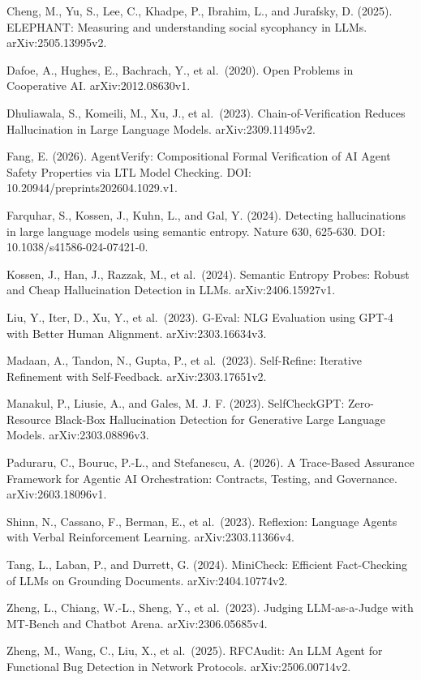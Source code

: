 \documentclass[
  10pt,
  a4paper,
]{article}
\begin{document}
Cheng, M., Yu, S., Lee, C., Khadpe, P., Ibrahim, L., and Jurafsky, D.
(2025). ELEPHANT: Measuring and understanding social sycophancy in LLMs.
arXiv:2505.13995v2.

Dafoe, A., Hughes, E., Bachrach, Y., et al.~(2020). Open Problems in
Cooperative AI. arXiv:2012.08630v1.

Dhuliawala, S., Komeili, M., Xu, J., et al.~(2023).
Chain-of-Verification Reduces Hallucination in Large Language Models.
arXiv:2309.11495v2.

Fang, E. (2026). AgentVerify: Compositional Formal Verification of AI
Agent Safety Properties via LTL Model Checking. DOI:
10.20944/preprints202604.1029.v1.

Farquhar, S., Kossen, J., Kuhn, L., and Gal, Y. (2024). Detecting
hallucinations in large language models using semantic entropy. Nature
630, 625-630. DOI: 10.1038/s41586-024-07421-0.

Kossen, J., Han, J., Razzak, M., et al.~(2024). Semantic Entropy Probes:
Robust and Cheap Hallucination Detection in LLMs. arXiv:2406.15927v1.

Liu, Y., Iter, D., Xu, Y., et al.~(2023). G-Eval: NLG Evaluation using
GPT-4 with Better Human Alignment. arXiv:2303.16634v3.

Madaan, A., Tandon, N., Gupta, P., et al.~(2023). Self-Refine: Iterative
Refinement with Self-Feedback. arXiv:2303.17651v2.

Manakul, P., Liusie, A., and Gales, M. J. F. (2023). SelfCheckGPT:
Zero-Resource Black-Box Hallucination Detection for Generative Large
Language Models. arXiv:2303.08896v3.

Paduraru, C., Bouruc, P.-L., and Stefanescu, A. (2026). A Trace-Based
Assurance Framework for Agentic AI Orchestration: Contracts, Testing,
and Governance. arXiv:2603.18096v1.

Shinn, N., Cassano, F., Berman, E., et al.~(2023). Reflexion: Language
Agents with Verbal Reinforcement Learning. arXiv:2303.11366v4.

Tang, L., Laban, P., and Durrett, G. (2024). MiniCheck: Efficient
Fact-Checking of LLMs on Grounding Documents. arXiv:2404.10774v2.

Zheng, L., Chiang, W.-L., Sheng, Y., et al.~(2023). Judging
LLM-as-a-Judge with MT-Bench and Chatbot Arena. arXiv:2306.05685v4.

Zheng, M., Wang, C., Liu, X., et al.~(2025). RFCAudit: An LLM Agent for
Functional Bug Detection in Network Protocols. arXiv:2506.00714v2.
\end{document}

